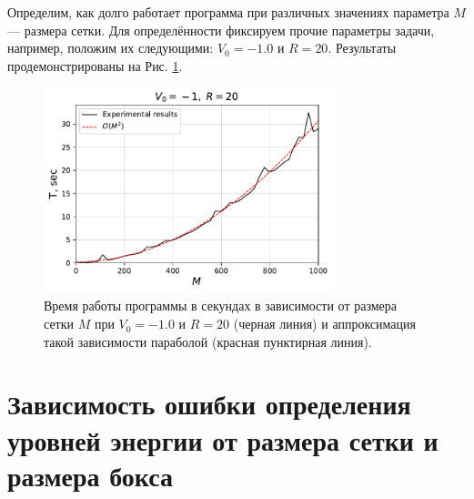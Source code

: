 \documentclass[10pt]{article}
\begin{document}
Определим, как долго работает программа при различных значениях параметра $M$ --- размера сетки. Для определённости фиксируем прочие параметры задачи, например, положим их следующими: $V_0 = -1.0$ и $R=20$. Результаты продемонстрированы на Рис. \ref{fig:T_vs_M}.
\begin{figure}[htbp]
    \centering
    \includegraphics[width=0.75\textwidth]{../figures/T_vs_M}
    \caption{Время работы программы в секундах в зависимости от размера сетки $M$ при $V_0 = -1.0$ и $R=20$ (черная линия) и аппроксимация такой зависимости параболой (красная пунктирная линия).}
    \label{fig:T_vs_M}
\end{figure}

\section{Зависимость ошибки определения уровней энергии от размера сетки и размера бокса}
\end{document}
